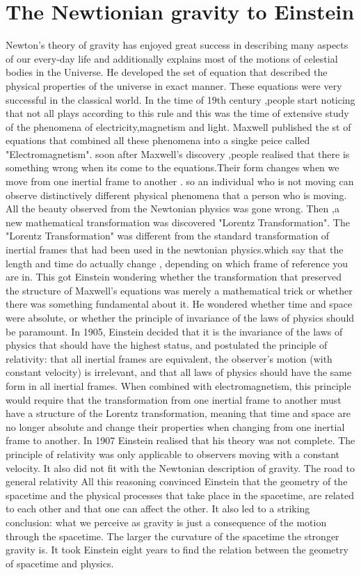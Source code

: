 \section{The Newtionian gravity to Einstein}

Newton's theory of gravity has enjoyed great success in describing many aspects of our every-day life and additionally explains most of the motions of celestial bodies in the Universe. He developed the set of equation that described the physical properties of the universe in exact manner. These equations were very successful in the classical world. In the time of 19th century ,people start noticing that not all plays according to this rule and this was the time of extensive study of the phenomena of electricity,magnetism and light. Maxwell published the st of equations that combined all these phenomena into a singke peice called "Electromagnetism". soon after Maxwell's discovery ,people realised that there is something wrong when its come to the equations.Their form changes when we move from one inertial frame to another . so an individual who is not moving can observe distinctively different physical phenomena that a person who is moving. All the beauty observed from the Newtonian physics was gone wrong. Then ,a new mathematical transformation was discovered "Lorentz Transformation". 
The "Lorentz Transformation" was different from the standard transformation of inertial frames that had been used in the newtonian physics.which say that the length and time do actually change , depending on which frame of reference you are in.
 This got Einstein wondering whether the transformation that preserved the structure of Maxwell’s equations was merely a mathematical trick or whether there was something fundamental about it. He wondered whether time and space were absolute, or whether the principle of invariance of the laws of physics should be paramount.
In 1905, Einstein decided that it is the invariance of the laws of physics that should have the highest status, and postulated the principle of relativity: that all inertial frames are equivalent, the observer’s motion (with constant velocity) is irrelevant, and that all laws of physics should have the same form in all inertial frames. When combined with electromagnetism, this principle would require that the transformation from one inertial frame to another must have a structure of the Lorentz transformation, meaning that time and space are no longer absolute and change their properties when changing from one inertial frame to another. In 1907 Einstein realised that his theory was not complete. The principle of relativity was only applicable to observers moving with a constant velocity. It also did not fit with the Newtonian description of gravity.
The road to general relativity
All this reasoning convinced Einstein that the geometry of the spacetime and the physical processes that take place in the spacetime, are related to each other and that one can affect the other. It also led to a striking conclusion: what we perceive as gravity is just a consequence of the motion through the spacetime. The larger the curvature of the spacetime the stronger gravity is. It took Einstein eight years to find the relation between the geometry of spacetime and physics.

